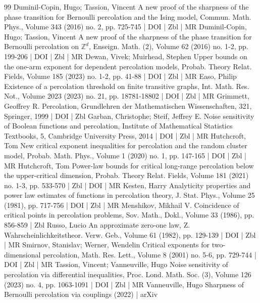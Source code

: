 \documentclass[10pt]{amsart}
\theoremstyle{definition}\newtheorem{defi}[theo]{Definition}\newtheorem{rema}[theo]{Remark}\newtheorem{exam}[theo]{Example}\newtheorem{exem}[theo]{Example}\newtheorem{nota}[theo]{Notation}
\begin{document}
\begin{thebibliography}{99}
 Duminil-Copin, Hugo; Tassion, Vincent A new proof of the sharpness of the phase transition for Bernoulli percolation and the Ising model, Commun. Math. Phys., Volume 343 (2016) no. 2, pp. 725-745 | DOI | Zbl | MR
 Duminil-Copin, Hugo; Tassion, Vincent A new proof of the sharpness of the phase transition for Bernoulli percolation on $\mathbb{Z}^d$, Enseign. Math. (2), Volume 62 (2016) no. 1-2, pp. 199-206 | DOI | Zbl | MR
 Dewan, Vivek; Muirhead, Stephen Upper bounds on the one-arm exponent for dependent percolation models, Probab. Theory Relat. Fields, Volume 185 (2023) no. 1-2, pp. 41-88 | DOI | Zbl | MR
 Easo, Philip Existence of a percolation threshold on finite transitive graphs, Int. Math. Res. Not., Volume 2023 (2023) no. 21, pp. 18781-18802 | DOI | Zbl | MR
 Grimmett, Geoffrey R. Percolation, Grundlehren der Mathematischen Wissenschaften, 321, Springer, 1999 | DOI | Zbl
 Garban, Christophe; Steif, Jeffrey E. Noise sensitivity of Boolean functions and percolation, Institute of Mathematical Statistics Textbooks, 5, Cambridge University Press, 2014 | DOI | Zbl | MR
 Hutchcroft, Tom New critical exponent inequalities for percolation and the random cluster model, Probab. Math. Phys., Volume 1 (2020) no. 1, pp. 147-165 | DOI | Zbl | MR
 Hutchcroft, Tom Power-law bounds for critical long-range percolation below the upper-critical dimension, Probab. Theory Relat. Fields, Volume 181 (2021) no. 1-3, pp. 533-570 | Zbl | DOI | MR
 Kesten, Harry Analyticity properties and power law estimates of functions in percolation theory, J. Stat. Phys., Volume 25 (1981), pp. 717-756 | DOI | Zbl | MR
 Menshikov, Mikhail V. Coincidence of critical points in percolation problems, Sov. Math., Dokl., Volume 33 (1986), pp. 856-859 | Zbl
 Russo, Lucio An approximate zero-one law, Z. Wahrscheinlichkeitstheor. Verw. Geb., Volume 61 (1982), pp. 129-139 | DOI | Zbl | MR
 Smirnov, Stanislav; Werner, Wendelin Critical exponents for two-dimensional percolation, Math. Res. Lett., Volume 8 (2001) no. 5-6, pp. 729-744 | DOI | Zbl | MR
 Tassion, Vincent; Vanneuville, Hugo Noise sensitivity of percolation via differential inequalities, Proc. Lond. Math. Soc. (3), Volume 126 (2023) no. 4, pp. 1063-1091 | DOI | Zbl | MR
 Vanneuville, Hugo Sharpness of Bernoulli percolation via couplings (2022) | arXiv
\end{thebibliography}
\end{document}
